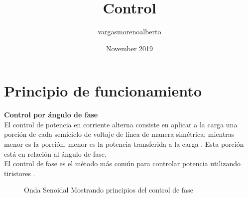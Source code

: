 \documentclass{article}
\title{Control}
\author{vargasmorenoalberto }
\date{November 2019}
\begin{document}
    

    \section{Principio de funcionamiento}
    \label{principio-de-funcionamiento}
    \textbf{Control por \'angulo de fase}\\
    El control de potencia en corriente alterna consiste en aplicar a la carga una porci\'on de cada semiciclo de voltaje de l\'inea de manera sim\'etrica; mientras menor es la porci\'on, menor es la potencia transferida a la carga \cite{slp}. Esta porci\'on est\'a en relaci\'on al \'angulo de fase. \\
    El control de fase es el m\'etodo m\'as com\'un para controlar potencia utilizando tiristores \cite{littelfuse}.\\

        \begin{figure}[htbp]
            \centering
            \caption{Onda Senoidal Mostrando principios del control de fase}
            \label{fig:formaDeOnda}
        \end{figure}
        
\end{document}
